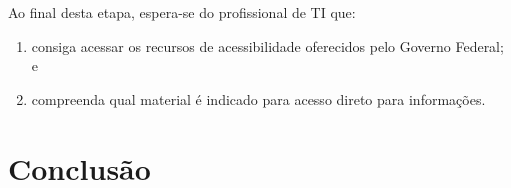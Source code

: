 \documentclass[
  12pt,
  openright,
  twoside,
  a4paper,
  english,
  french,
  spanish,
  brazil
]{abntex2}
\begin{document}
Ao final desta etapa, espera-se do profissional de TI que:

\begin{enumerate}
  \item
    consiga acessar os recursos de acessibilidade oferecidos pelo Governo
    Federal; e
  \item compreenda qual material é indicado para acesso direto para informações.
\end{enumerate}

\chapter{Conclusão}

\postextual



\printindex
\end{document}
